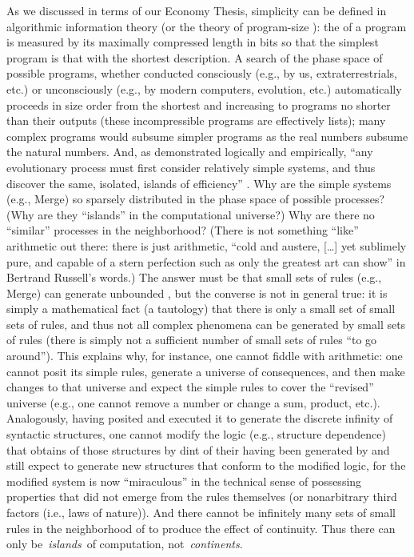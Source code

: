 \documentclass[output=paper]{langsci/langscibook}
\begin{document}
{As we discussed in terms of our Economy Thesis,} simplicity can
be defined in algorithmic information theory (or the theory of program-size
): the  of a program is measured by its maximally
compressed length in bits so that the simplest program is that with the
shortest description. A search of the phase space of possible
programs, whether conducted consciously (e.g., by us, extraterrestrials, etc.)
or unconsciously (e.g., by modern computers, evolution, etc.) automatically
proceeds in size order from the shortest and increasing to programs no shorter
than their outputs (these incompressible programs are effectively lists); many
complex programs would subsume simpler programs as the real numbers subsume the
natural numbers. And, as demonstrated logically and empirically,
“any evolutionary process must first consider relatively simple systems, and
thus discover the same, isolated, islands of efficiency”
\citep[122]{Minsky1985}. Why are the simple systems (e.g., Merge) so sparsely
distributed in the phase space of possible processes? (Why are they
“islands”
in the computational universe?) Why are there no “similar” processes in the
neighborhood? (There is not something “like” arithmetic out there: there is
just arithmetic, “cold and austere, […] yet sublimely pure, and capable of a
stern perfection such as only the greatest art can show” in Bertrand Russell’s
words.) The answer must be that small sets of rules (e.g., Merge) can generate
unbounded , but the converse is not in general true: it is simply a
mathematical fact (a tautology) that there is only a small set of small sets of
rules, and thus not all complex phenomena can be generated by small sets of
rules (there is simply not a sufficient number of small sets of rules “to go
around”). This explains why, for instance, one cannot fiddle with arithmetic:
one cannot posit its simple rules, generate a universe of consequences, and
then make changes to that universe and expect the simple rules to cover the
“revised” universe (e.g., one cannot remove a number or change a sum, product,
etc.). Analogously, having posited  and executed it to generate the
discrete infinity of syntactic structures, one cannot modify the logic (e.g.,
structure dependence) that obtains of those structures by dint of their having
been generated by  and still expect  to generate new structures that
conform to the modified logic, for the modified system is now “miraculous” in
the technical sense of possessing properties that did not emerge from the rules
themselves (or nonarbitrary third factors (i.e., laws of nature)). And there
cannot be infinitely many sets of small rules in the neighborhood of  to
produce the effect of continuity. Thus there can only be~\emph{islands}~of
computation, not~\emph{continents}.
\end{document}
